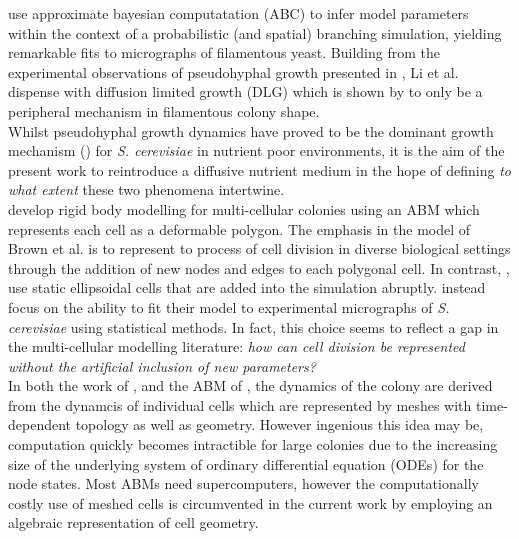  \cite{li2024off} use approximate bayesian computatation (ABC)
 to infer model parameters within the context of a probabilistic (and spatial) branching simulation, 
 yielding remarkable fits to micrographs of filamentous yeast. Building 
 from the experimental observations of pseudohyphal growth presented in 
 \cite{gimeno1992unipolar}, Li et al. dispense with diffusion limited growth (DLG) which is
shown by \cite{tronnolone2018diffusion} to only be a peripheral mechanism in filamentous 
colony shape.
\\

Whilst pseudohyphal growth dynamics
have proved to be the dominant growth mechanism (\cite{tronnolone2018diffusion}) for 
\textit{S. cerevisiae} in nutrient poor environments, it is the aim of the present 
work to reintroduce a diffusive nutrient medium in the hope of defining 
\textit{to what extent} these two phenomena intertwine.
\\

\cite{brown2021rigid} develop rigid body modelling for multi-cellular colonies using 
an ABM which represents each cell as a deformable polygon. The emphasis in the model 
of Brown et al. is to represent to process of cell division in diverse biological 
settings through the addition of new nodes and edges to each polygonal cell. 
In contrast, \cite{li2024off}, use static ellipsoidal cells that are added into the simulation
abruptly. \cite{li2024off} instead focus on the ability to fit their model 
to experimental micrographs of \textit{S. cerevisiae} using statistical methods.
In fact, this choice seems to reflect a gap in the multi-cellular modelling literature:
\textit{how can cell division be represented without the artificial inclusion of new parameters?}
\\

In both the work of \cite{van2020quantitative}, and the ABM of 
\cite{brown2021rigid}, the dynamics of the colony 
are derived from the dynamcis of individual cells which are represented
by meshes with time-dependent topology as well as geometry. However ingenious this idea may be, 
computation quickly becomes intractible for large colonies
due to the increasing size of the underlying system of ordinary differential equation (ODEs)
for the node states. Most ABMs need supercomputers, however
the computationally costly use of meshed cells is circumvented in the current work by employing 
an algebraic representation of cell geometry.
\\






